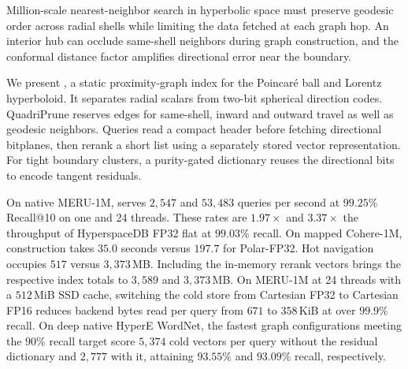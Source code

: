 Million-scale nearest-neighbor search in hyperbolic space must preserve geodesic order across radial shells while limiting the data fetched at each graph hop. An interior hub can occlude same-shell neighbors during graph construction, and the conformal distance factor amplifies directional error near the boundary.

We present \textbf{\rquiver{}}, a static proximity-graph index for the Poincar\'e ball and Lorentz hyperboloid. It separates radial scalars from two-bit spherical direction codes. QuadriPrune reserves edges for same-shell, inward and outward travel as well as geodesic neighbors. Queries read a compact header before fetching directional bitplanes, then rerank a short list using a separately stored vector representation. For tight boundary clusters, a purity-gated dictionary reuses the directional bits to encode tangent residuals.

On native {MERU-1M}, \rquiver{} serves $2{,}547$ and $53{,}483$ queries per second at $99.25\%$ Recall@10 on one and 24 threads. These rates are $1.97\times$ and $3.37\times$ the throughput of {HyperspaceDB} FP32 flat at $99.03\%$ recall. On mapped {Cohere-1M}, construction takes $35.0$ seconds versus $197.7$ for {Polar-FP32}. Hot navigation occupies $517$ versus $3{,}373$\,MB. Including the in-memory rerank vectors brings the respective index totals to $3{,}589$ and $3{,}373$\,MB. On {MERU-1M} at 24 threads with a $512$\,MiB SSD cache, switching the cold store from Cartesian FP32 to Cartesian FP16 reduces backend bytes read per query from $671$ to $358$\,KiB at over $99.9\%$ recall. On deep native {HyperE WordNet}, the fastest graph configurations meeting the $90\%$ recall target score $5{,}374$ cold vectors per query without the residual dictionary and $2{,}777$ with it, attaining $93.55\%$ and $93.09\%$ recall, respectively.
